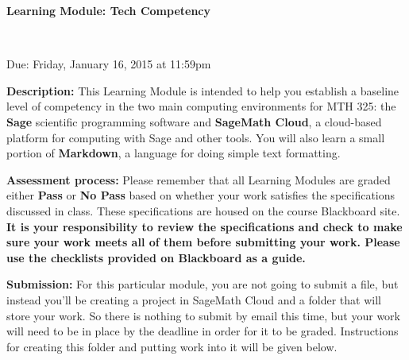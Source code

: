 \documentclass[11pt,letterpaper]{article}
\begin{document}
\begin{center}
	\begin{Large}
		\textbf{Learning Module: Tech Competency} 
	\end{Large} \\
	\begin{large}
		Due: Friday, January 16, 2015 at 11:59pm 
	\end{large}
\end{center}

\textbf{Description:} This Learning Module is intended to help you establish a baseline level of competency in the two main computing environments for MTH 325: the \textbf{Sage} scientific programming software and \textbf{SageMath Cloud}, a cloud-based platform for computing with Sage and other tools. You will also learn a small portion of \textbf{Markdown}, a language  for doing simple text formatting.

\smallskip




\smallskip

\textbf{Assessment process:} Please remember that all Learning Modules are graded either \textbf{Pass} or \textbf{No Pass} based on whether your work satisfies the specifications discussed in class. These specifications are housed on the course Blackboard site. \textbf{It is your responsibility to review the specifications and check to make sure your work meets all of them before submitting your work. Please use the checklists provided on Blackboard as a guide.} 

\smallskip

\textbf{Submission:} For this particular module, you are not going to submit a file, but instead you'll be creating a project in SageMath Cloud and a folder that will store your work. So there is nothing to submit by email this time, but your work will need to be in place by the deadline in order for it to be graded. Instructions for creating this folder and putting work into it will be given below. 
\end{document}
